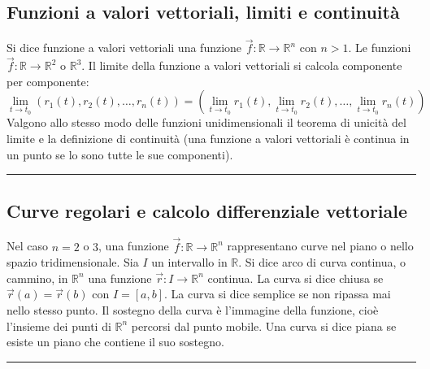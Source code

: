 \subsection{Funzioni a valori vettoriali, limiti e continuità}
Si dice funzione a valori vettoriali una funzione $\vec{f} : \mathbb{R} \rightarrow  \mathbb{R}^n$ con $n > 1$. Le funzioni $\vec{f} : \mathbb{R} \rightarrow \mathbb{R}^2$ o $\mathbb{R}^3$.\newline
Il limite della funzione a valori vettoriali si calcola componente per componente:
\[
    \lim_{t\rightarrow t_0}(r_1(t), r_2(t), \dots, r_n(t)) = \left(\lim_{t\rightarrow t_0}r_1(t), \lim_{t\rightarrow t_0}r_2(t), \dots, \lim_{t\rightarrow t_0}r_n(t)\right)
\]
Valgono allo stesso modo delle funzioni unidimensionali il teorema di unicità del limite e la definizione di continuità (una funzione a valori vettoriali è continua in un punto se lo sono tutte le sue componenti).\newline
\rule{\textwidth}{2pt}
\subsection{Curve regolari e calcolo differenziale vettoriale}
Nel caso $n = 2$ o $3$, una funzione $\vec{f} : \mathbb{R} \rightarrow  \mathbb{R}^n$ rappresentano curve nel piano o nello spazio tridimensionale.\newline
Sia $I$ un intervallo in $\mathbb{R}$. Si dice arco di curva continua, o cammino, in $\mathbb{R}^n$ una funzione $\vec{r}: I \rightarrow \mathbb{R}^n$ continua.\newline
La curva si dice chiusa se $\vec{r}(a) = \vec{r}(b)$ con $I=[a,b]$.\newline
La curva si dice semplice se non ripassa mai nello stesso punto.\newline
Il sostegno della curva è l'immagine della funzione, cioè l'insieme dei punti di $\mathbb{R}^n$ percorsi dal punto mobile.\newline
Una curva si dice piana se esiste un piano che contiene il suo sostegno.\newline
\rule{\textwidth}{0,4pt}

